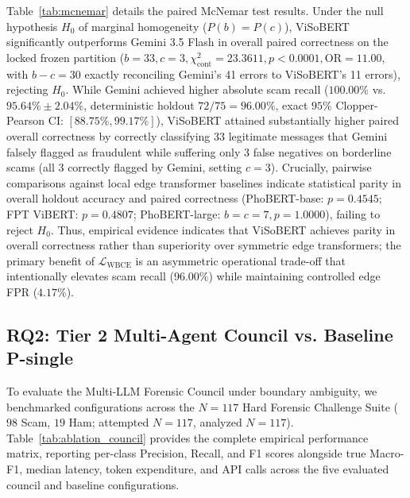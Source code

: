 \documentclass[journal]{IEEEtran}
\begin{document}
Table~\ref{tab:mcnemar} details the paired McNemar test results. Under the null hypothesis $H_0$ of marginal homogeneity ($P(b) = P(c)$), ViSoBERT significantly outperforms Gemini 3.5 Flash in overall paired correctness on the locked frozen partition ($b=33, c=3, \chi^2_{\text{cont}} = 23.3611, p < 0.0001, \text{OR} = 11.00$, with $b - c = 30$ exactly reconciling Gemini's 41 errors to ViSoBERT's 11 errors), rejecting $H_0$. While Gemini achieved higher absolute scam recall ($100.00\%$ vs. $95.64\% \pm 2.04\%$, deterministic holdout $72/75 = 96.00\%$, exact $95\%$ Clopper-Pearson CI: $[88.75\%, 99.17\%]$), ViSoBERT attained substantially higher paired overall correctness by correctly classifying 33 legitimate messages that Gemini falsely flagged as fraudulent while suffering only 3 false negatives on borderline scams (all 3 correctly flagged by Gemini, setting $c=3$). Crucially, pairwise comparisons against local edge transformer baselines indicate statistical parity in overall holdout accuracy and paired correctness (PhoBERT-base: $p=0.4545$; FPT ViBERT: $p=0.4807$; PhoBERT-large: $b=c=7, p=1.0000$), failing to reject $H_0$. Thus, empirical evidence indicates that ViSoBERT achieves parity in overall correctness rather than superiority over symmetric edge transformers; the primary benefit of $\mathcal{L}_{\text{WBCE}}$ is an asymmetric operational trade-off that intentionally elevates scam recall ($96.00\%$) while maintaining controlled edge FPR ($4.17\%$).

\subsection{RQ2: Tier 2 Multi-Agent Council vs. Baseline P-single}
\label{subsec:rq2}

To evaluate the Multi-LLM Forensic Council under boundary ambiguity, we benchmarked configurations across the $N = 117$ Hard Forensic Challenge Suite ($98$ Scam, $19$ Ham; attempted $N=117$, analyzed $N=117$). Table~\ref{tab:ablation_council} provides the complete empirical performance matrix, reporting per-class Precision, Recall, and F1 scores alongside true Macro-F1, median latency, token expenditure, and API calls across the five evaluated council and baseline configurations.
\end{document}
